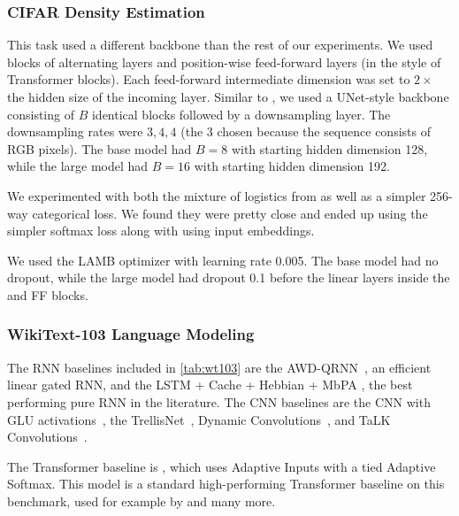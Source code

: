 \subsubsection{CIFAR Density Estimation}
\label{sec:experiment-details-general-cifargen}

This task used a different backbone than the rest of our experiments.
We used blocks of alternating \methodabbrv{} layers and position-wise feed-forward layers (in the style of Transformer blocks).
Each feed-forward intermediate dimension was set to \( 2\times \) the hidden size of the incoming \methodabbrv{} layer.
Similar to \citet{salimans2017pixelcnn++}, we used a UNet-style backbone consisting of \( B \) identical blocks followed by a downsampling layer.
The downsampling rates were \( 3, 4, 4 \) (the 3 chosen because the sequence consists of RGB pixels).
The base model had \( B=8 \) with starting hidden dimension 128,
while the large model had \( B=16 \) with starting hidden dimension 192.

We experimented with both the mixture of logistics from \citep{salimans2017pixelcnn++} as well as a simpler 256-way categorical loss.
We found they were pretty close and ended up using the simpler softmax loss along with using input embeddings.

We used the LAMB optimizer with learning rate 0.005.
The base model had no dropout, while the large model had dropout 0.1 before the linear layers inside the \methodabbrv{} and FF blocks.


\subsubsection{WikiText-103 Language Modeling}
\label{sec:experiment-details-general-wt103}

The RNN baselines included in \cref{tab:wt103} are the
AWD-QRNN~\citep{merity2018scalable}, an efficient linear gated RNN,
and the LSTM + Cache + Hebbian + MbPA \citep{rae2018fast}, the best performing pure RNN in the literature.
The CNN baselines are
the CNN with GLU activations~\citep{dauphin2017language},
the TrellisNet~\citep{trellisnet},
Dynamic Convolutions~\citep{wu2019pay},
and TaLK Convolutions~\citep{lioutas2020time}.

The Transformer baseline is \citep{baevski2018adaptive},
which uses Adaptive Inputs with a tied Adaptive Softmax.
This model is a standard high-performing Transformer baseline on this benchmark,
used for example by \citet{lioutas2020time} and many more.

